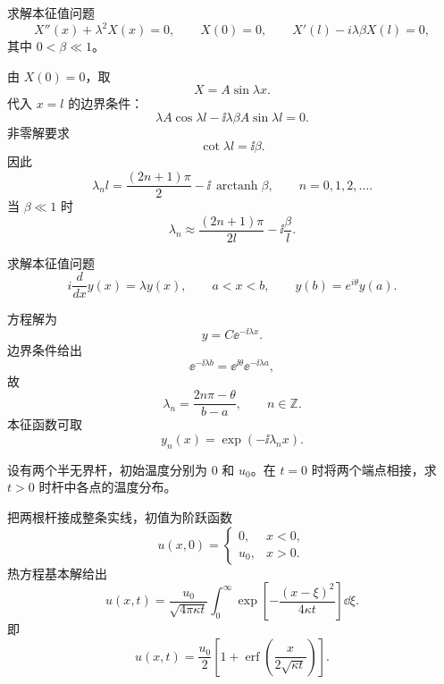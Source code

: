 \begin{question}
求解本征值问题
\[
X''(x)+\lambda^2X(x)=0,\qquad
X(0)=0,\qquad X'(l)-i\lambda\beta X(l)=0,
\]
其中 \(0<\beta\ll1\)。
\begin{solution}
由 \(X(0)=0\)，取
\[
X=A\sin\lambda x.
\]
代入 \(x=l\) 的边界条件：
\[
\lambda A\cos\lambda l-\ii\lambda\beta A\sin\lambda l=0.
\]
非零解要求
\[
\cot\lambda l=\ii\beta.
\]
因此
\[
\lambda_n l=\frac{(2n+1)\pi}{2}-\ii\,\operatorname{arctanh}\beta,
\qquad n=0,1,2,\ldots .
\]
当 \(\beta\ll1\) 时
\[
\lambda_n\approx \frac{(2n+1)\pi}{2l}-\ii\frac{\beta}{l}.
\]
\end{solution}
\end{question}

\begin{question}
求解本征值问题
\[
i\frac d{dx}y(x)=\lambda y(x),\qquad a<x<b,\qquad
y(b)=e^{i\theta}y(a).
\]
\begin{solution}
方程解为
\[
y=C \ee^{-\ii\lambda x}.
\]
边界条件给出
\[
\ee^{-\ii\lambda b}=\ee^{\ii\theta}\ee^{-\ii\lambda a},
\]
故
\[
\lambda_n=\frac{2n\pi-\theta}{b-a},\qquad n\in\mathbb Z.
\]
本征函数可取
\[
y_n(x)=\exp\left(-\ii\lambda_n x\right).
\]
\end{solution}
\end{question}

\begin{question}
设有两个半无界杆，初始温度分别为 \(0\) 和 \(u_0\)。在 \(t=0\) 时将两个端点相接，求 \(t>0\) 时杆中各点的温度分布。

\begin{solution}
把两根杆接成整条实线，初值为阶跃函数
\[
u(x,0)=
\begin{cases}
0,&x<0,\\
u_0,&x>0.
\end{cases}
\]
热方程基本解给出
\[
u(x,t)=\frac{u_0}{\sqrt{4\pi\kappa t}}\int_0^\infty
\exp\left[-\frac{(x-\xi)^2}{4\kappa t}\right]\dd{\xi}.
\]
即
\[
u(x,t)=\frac{u_0}{2}\left[
1+\operatorname{erf}\left(\frac{x}{2\sqrt{\kappa t}}\right)
\right].
\]
\end{solution}
\end{question}

